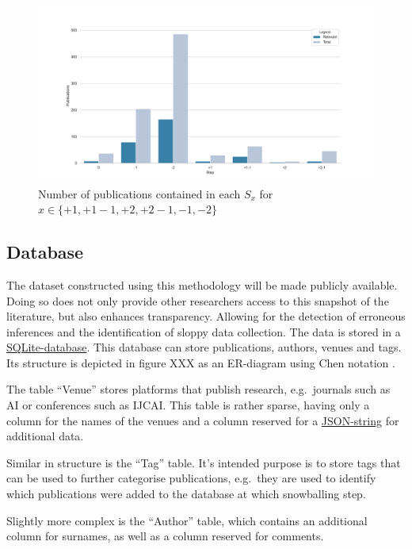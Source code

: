 \documentclass[11pt,a4paper]{book}
\theoremstyle{definition}
\theoremstyle{definition}
\theoremstyle{definition}
\theoremstyle{remark}
\newcommand{\pset}{S}
\begin{document}
\begin{figure}[h]
\includegraphics[width=\textwidth]{relevant_publications_per_step.png}
\caption{Number of publications contained in each $\pset_x$ for $x \in \{ \mathit{+1}, \mathit{+1-1}, \mathit{+2}, \mathit{+2-1}, \mathit{-1}, \mathit{-2}\}$}
\label{fig:pgraph-relevant_publications_per_step}
\end{figure}



\subsection{Database}

The dataset constructed using this methodology will be made publicly available. Doing so does not only provide other researchers access to this snapshot of the literature, but also enhances transparency. Allowing for the detection of erroneous inferences and the identification of sloppy data collection. The data is stored in a \href{https://www.sqlite.org/index.html}{SQLite-database}. This database can store publications, authors, venues and tags. Its structure is depicted in figure XXX as an ER-diagram using Chen notation \parencite{chen1976entity}.

The table ``Venue'' stores platforms that publish research, e.g.\ journals such as AI or conferences such as IJCAI. This table is rather sparse, having only a column for the names of the venues and a column reserved for a \href{https://www.json.org/json-en.html}{JSON-string} for additional data. 

Similar in structure is the ``Tag'' table. It's intended purpose is to store tags that can be used to further categorise publications, e.g.\ they are used to identify which publications were added to the database at which snowballing step.

Slightly more complex is the ``Author'' table, which contains an additional column for surnames, as well as a column reserved for comments. 
\end{document}
